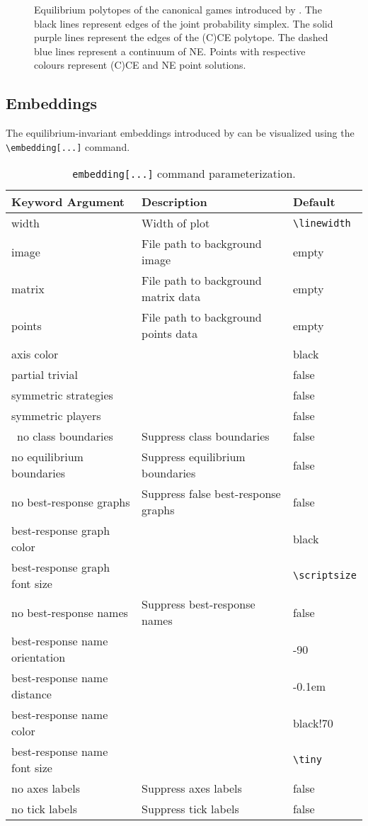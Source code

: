 \documentclass[10pt]{article}
\begin{document}
\begin{figure}[t]
    \caption{Equilibrium polytopes of the canonical games introduced by \cite{marris2023_equilibrium_invariant_embedding_2x2_arxiv}. The black lines represent edges of the joint probability simplex. The solid purple lines represent the edges of the (C)CE polytope. The dashed blue lines represent a continuum of NE. Points with respective colours represent (C)CE and NE point solutions.}
    \label{fig:polytopes}
\end{figure}


\subsection{Embeddings}

The equilibrium-invariant embeddings introduced by \cite{marris2023_equilibrium_invariant_embedding_2x2_arxiv} can be visualized using the \verb!\embedding[...]! command.

\begin{table}[t]
    \centering
    \footnotesize
    \begin{tabular}{lll}
        Keyword Argument & Description & Default \\ \hline
        width & Width of plot & \verb!\linewidth! \\
        image & File path to background image & empty \\
        matrix & File path to background matrix data & empty \\
        points & File path to background points data & empty \\
        axis color & & black \\
        partial trivial & & false \\
        symmetric strategies & & false \\
        symmetric players & & false \\\
        no class boundaries & Suppress class boundaries & false\\
        no equilibrium boundaries & Suppress equilibrium boundaries & false\\
        no best-response graphs & Suppress false best-response graphs & false \\
        best-response graph color & & black\\
        best-response graph font size & & \verb!\scriptsize! \\
        no best-response names & Suppress best-response names & false \\
        best-response name orientation & & -90 \\
        best-response name distance & & -0.1em \\
        best-response name color & & black!70 \\
        best-response name font size & & \verb!\tiny! \\
        no axes labels & Suppress axes labels & false \\
        no tick labels & Suppress tick labels & false \\
    \end{tabular}
    \cprotect\caption{\verb!embedding[...]! command parameterization.}
    \label{tab:embedding_command_args}
\end{table}
\end{document}
